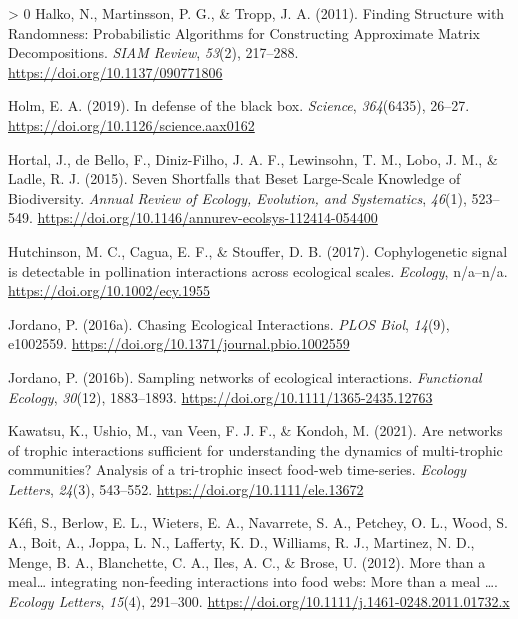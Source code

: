 \documentclass[10pt,oneside]{article}
\newlength{\cslhangindent}
\newenvironment{CSLReferences}[3] %
 {%
  \setlength{\parindent}{0pt}
  \ifodd #1 \everypar{\setlength{\hangindent}{\cslhangindent}}\ignorespaces\fi
  \ifnum #2 > 0
  \setlength{\parskip}{#2\baselineskip}
  \fi
 }%
 {}
\begin{document}
\begin{CSLReferences}{1}{0}
\leavevmode\hypertarget{ref-Halko2011FinStr}{}%
Halko, N., Martinsson, P. G., \& Tropp, J. A. (2011). Finding Structure
with Randomness: Probabilistic Algorithms for Constructing Approximate
Matrix Decompositions. \emph{SIAM Review}, \emph{53}(2), 217--288.
\url{https://doi.org/10.1137/090771806}

\leavevmode\hypertarget{ref-Holm2019DefBla}{}%
Holm, E. A. (2019). In defense of the black box. \emph{Science},
\emph{364}(6435), 26--27. \url{https://doi.org/10.1126/science.aax0162}

\leavevmode\hypertarget{ref-Hortal2015SevSho}{}%
Hortal, J., de Bello, F., Diniz-Filho, J. A. F., Lewinsohn, T. M., Lobo,
J. M., \& Ladle, R. J. (2015). Seven Shortfalls that Beset Large-Scale
Knowledge of Biodiversity. \emph{Annual Review of Ecology, Evolution,
and Systematics}, \emph{46}(1), 523--549.
\url{https://doi.org/10.1146/annurev-ecolsys-112414-054400}

\leavevmode\hypertarget{ref-Hutchinson2017CopSig}{}%
Hutchinson, M. C., Cagua, E. F., \& Stouffer, D. B. (2017).
Cophylogenetic signal is detectable in pollination interactions across
ecological scales. \emph{Ecology}, n/a--n/a.
\url{https://doi.org/10.1002/ecy.1955}

\leavevmode\hypertarget{ref-Jordano2016ChaEco}{}%
Jordano, P. (2016a). Chasing Ecological Interactions. \emph{PLOS Biol},
\emph{14}(9), e1002559.
\url{https://doi.org/10.1371/journal.pbio.1002559}

\leavevmode\hypertarget{ref-Jordano2016SamNet}{}%
Jordano, P. (2016b). Sampling networks of ecological interactions.
\emph{Functional Ecology}, \emph{30}(12), 1883--1893.
\url{https://doi.org/10.1111/1365-2435.12763}

\leavevmode\hypertarget{ref-Kawatsu2021AreNet}{}%
Kawatsu, K., Ushio, M., van Veen, F. J. F., \& Kondoh, M. (2021). Are
networks of trophic interactions sufficient for understanding the
dynamics of multi-trophic communities? Analysis of a tri-trophic insect
food-web time-series. \emph{Ecology Letters}, \emph{24}(3), 543--552.
\url{https://doi.org/10.1111/ele.13672}

\leavevmode\hypertarget{ref-Kefi2012MorMea}{}%
Kéfi, S., Berlow, E. L., Wieters, E. A., Navarrete, S. A., Petchey, O.
L., Wood, S. A., Boit, A., Joppa, L. N., Lafferty, K. D., Williams, R.
J., Martinez, N. D., Menge, B. A., Blanchette, C. A., Iles, A. C., \&
Brose, U. (2012). More than a meal\ldots{} integrating non-feeding
interactions into food webs: More than a meal \ldots. \emph{Ecology
Letters}, \emph{15}(4), 291--300.
\url{https://doi.org/10.1111/j.1461-0248.2011.01732.x}


\end{CSLReferences}
\end{document}
